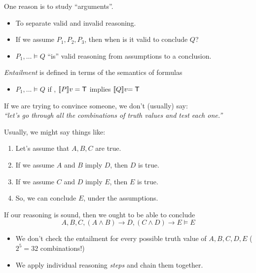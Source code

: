 \documentclass[xetex,aspectratio=169,14pt,hyperref={pdfpagelabels=true,pdflang={en-GB}}]{beamer}
\begin{document}
\frame{\titlepage}


\begin{frame}
  One reason is to study ``arguments''.
  \begin{itemize}
  \item To separate valid and invalid reasoning.
  \item If we assume $P_1, P_2, P_3$, then when is it valid to conclude $Q$?
  \end{itemize}

  \pause
  \bigskip

  \begin{itemize}
  \item $P_1, \dots \models Q$ ``is'' valid reasoning from assumptions to a conclusion.
  \end{itemize}
  \emph{Entailment} is defined in terms of the semantics of formulas
  \begin{itemize}
  \item $P_1, ... \models Q$ if , $\llbracket P \rrbracket v = \mathsf{T}$ implies $\llbracket Q \rrbracket v \kern-3pt= \mathsf{T}$
  \end{itemize}

  \pause
  \pause
  \bigskip

  If we are trying to convince someone, we don't (usually) say: \\
  \qquad \emph{``let's go through all the combinations of truth values and test each one.''}
\end{frame}

\begin{frame}
  Usually, we might say things like:
  \begin{enumerate}
  \item Let's assume that $A, B, C$ are true.
  \item If we assume $A$ and $B$ imply $D$, then $D$ is true.
  \item If we assume $C$ and $D$ imply $E$, then $E$ is true.
  \item So, we can conclude $E$, under the assumptions.
  \end{enumerate}
  If our reasoning is sound, then we ought to be able to conclude
  \begin{displaymath}
    A, B, C, (A \land B) \to D, (C \land D) \to E \models E
  \end{displaymath}

  \pause
  \begin{itemize}
  \item We don't check the entailment for every possible truth value of $A, B, C, D, E$ \qquad \textcolor{black!60}{($2^5 = 32$ combinations!)}
  \item We apply individual reasoning \emph{steps} and chain them together.
  \end{itemize}
\end{frame}
\end{document}
